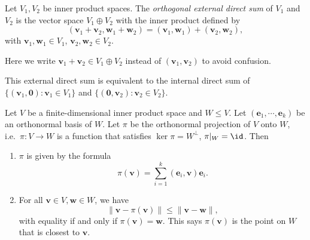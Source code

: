 \documentclass[a4paper]{article}
\begin{document}
\begin{defi}
  Let $V_1, V_2$ be inner product spaces. The \emph{orthogonal external direct sum} of $V_1$ and $V_2$ is the vector space $V_1 \oplus V_2$ with the inner product defined by
  \[
    (\mathbf{v}_1 + \mathbf{v}_2, \mathbf{w}_1 + \mathbf{w}_2) = (\mathbf{v}_1, \mathbf{w}_1) + (\mathbf{v}_2, \mathbf{w}_2),
  \]
  with $\mathbf{v}_1, \mathbf{w}_1 \in V_1$, $\mathbf{v}_2, \mathbf{w}_2 \in V_2$.

  Here we write $\mathbf{v}_1 + \mathbf{v}_2 \in V_1 \oplus V_2$ instead of $(\mathbf{v}_1, \mathbf{v}_2)$ to avoid confusion.
\end{defi}
This external direct sum is equivalent to the internal direct sum of $\{(\mathbf{v}_1, \mathbf{0}): \mathbf{v}_1 \in V_1\}$ and $\{(\mathbf{0}, \mathbf{v}_2): \mathbf{v}_2 \in V_2\}$.

\begin{prop}
  Let $V$ be a finite-dimensional inner product space and $W \leq V$. Let $(\mathbf{e}_1, \cdots, \mathbf{e}_k)$ be an orthonormal basis of $W$. Let $\pi$ be the orthonormal projection of $V$ onto $W$, i.e.\ $\pi: V \to W$ is a function that satisfies $\ker \pi = W^\perp$, $\pi|_W = \id$. Then
  \begin{enumerate}
    \item $\pi$ is given by the formula
      \[
        \pi(\mathbf{v}) = \sum_{i = 1}^k (\mathbf{e}_i, \mathbf{v}) \mathbf{e}_i.
      \]
    \item For all $\mathbf{v}\in V, \mathbf{w} \in W$, we have
      \[
        \|\mathbf{v} - \pi(\mathbf{v})\| \leq \|\mathbf{v} - \mathbf{w}\|,
      \]
      with equality if and only if $\pi(\mathbf{v}) = \mathbf{w}$. This says $\pi(\mathbf{v})$ is the point on $W$ that is closest to $\mathbf{v}$.
      \begin{center}
      \end{center}
  \end{enumerate}
\end{prop}
\end{document}
